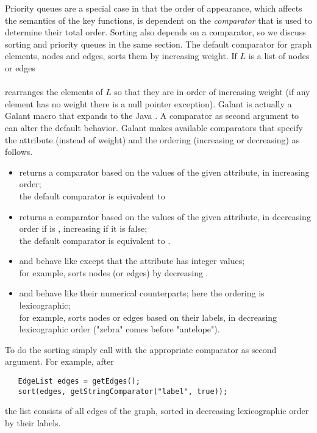 Priority queues are a special case in that the order of appearance, which
affects the semantics of the key functions,
is dependent on the \emph{comparator} that is used to
determine their total order. Sorting also depends on a comparator, so we
discuss sorting and priority queues in the same section.
The default comparator for graph elements, nodes and edges, sorts them by
increasing weight. If $L$ is a list of nodes or edges\\
\hspace*{1em}\\
rearranges the elements of $L$ so that they are in order of increasing weight
(if any element has no weight there is a null pointer exception). Galant  is
actually a Galant macro that expands to the Java .
A comparator as second argument to  can alter the default
behavior. Galant makes available comparators that specify the attribute
(instead of weight) and the ordering (increasing or decreasing) as follows.
\begin{itemize}
  \item {} returns a comparator
    based on the values of the given attribute, in increasing order;\\
    the default comparator is equivalent to 
  \item {} returns a comparator
    based on the values of the given attribute, in decreasing order if
     is , increasing if it is false;\\
    the default comparator is equivalent to .
  \item {} and
     behave
    like  except that the attribute has integer
    values;\\
    for example, 
    sorts nodes (or edges) by decreasing .
  \item {} and
     behave like
    their numerical counterparts; here the ordering is lexicographic;\\
    for example,  sorts
    nodes or edges based on their labels, in decreasing lexicographic order
    ("zebra" comes before "antelope").
\end{itemize}
To do the sorting simply call  with the appropriate comparator as
second argument. For example, after
\begin{verbatim}
   EdgeList edges = getEdges();
   sort(edges, getStringComparator("label", true));
\end{verbatim}
the list  consists of all edges of the graph, sorted in
decreasing lexicographic order by their labels.

